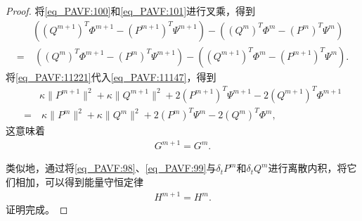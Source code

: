 \begin{proof}
将\eqref{eq_PAVF:100}和\eqref{eq_PAVF:101}进行叉乘，得到
\begin{align}\label{eq_PAVF:11221}
&((Q^{m+1})^{T}\varPhi^{m+1}-(P^{m+1})^{T}\Psi^{m+1})-((Q^{m})^{T}\varPhi^{m}-(P^{m})^{T}\Psi^{m})\nonumber\\
=&~((Q^{m})^{T}\varPhi^{m+1}-(P^{m})^{T}\Psi^{m+1})-((Q^{m+1})^{T}\varPhi^{m}-(P^{m+1})^{T}\Psi^{m}).
\end{align}
将\eqref{eq_PAVF:11221}代入\eqref{eq_PAVF:11147}，得到
\begin{align}
&\kappa \|P^{m+1}\|^2+\kappa \|Q^{m+1}\|^2+2(P^{m+1})^{T}\Psi^{m+1}-2(Q^{m+1})^{T}\varPhi^{m+1}\nonumber
\\=&~\kappa \|P^{m}\|^2+\kappa \|Q^{m}\|^2+2(P^{m})^{T}\Psi^{m}-2(Q^{m})^{T}\varPhi^{m},\label{eq_PAVF:11155}
\end{align}
这意味着
\begin{align}\label{eq_PAVF:11149}
G^{m+1}=G^{m} .
\end{align}

类似地，通过将\eqref{eq_PAVF:98}、\eqref{eq_PAVF:99}与$\delta_t P^{m}$和$\delta_t Q^{m}$进行离散内积，将它们相加，可以得到能量守恒定律
\begin{align}\label{eq_PAVF:11156}
H^{m+1}=H^{m}.
\end{align}
证明完成。
\end{proof}

